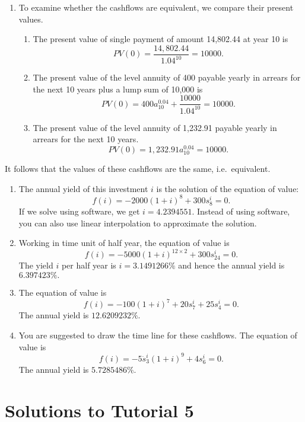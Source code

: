 \documentclass[
]{article}
\theoremstyle{definition}
\theoremstyle{definition}
\theoremstyle{definition}
\theoremstyle{definition}
\theoremstyle{remark}
\begin{document}
\begin{enumerate}
\def\labelenumi{\arabic{enumi}.}
\item
  To examine whether the cashflows are equivalent, we compare their present values.

  \begin{enumerate}
  \def\labelenumii{\alph{enumii}.}
  \item
    The present value of single payment of amount 14,802.44 at year 10 is
    \[ PV(0) =  \frac{14,802.44}{1.04^{10}} = 10000.\]
  \item
    The present value of the level annuity of 400 payable yearly in arrears for the next 10 years plus a lump sum of 10,000 is
    \[ PV(0) =  400 a^{0.04}_{10} +\frac{10000}{1.04^{10}} = 10000.\]
  \item
    The present value of the level annuity of 1,232.91 payable yearly in arrears for the next 10 years.
    \[ PV(0) =  1,232.91 a^{0.04}_{10}  = 10000.\]
  \end{enumerate}
\end{enumerate}

It follows that the values of these cashflows are the same, i.e.~equivalent.

\begin{enumerate}
\def\labelenumi{\arabic{enumi}.}
\setcounter{enumi}{1}
\item
  The annual yield of this investment \(i\) is the solution of the equation of value:
  \[ f(i) = -2000(1+i)^8 +300 s^i_8 = 0. \]
  If we solve using software, we get \(i = 4.2394551%
  \). Instead of using software, you can also use linear interpolation to approximate the solution.
\item
  Working in time unit of half year, the equation of value is
  \[ f(i) = -5000(1+i)^{12 \times 2} + 300 s^i_{24} = 0. \]
  The yield \(i\) per half year is \(i = 3.1491266\%\) and hence the annual yield is \(6.397423\%.\)
\item
  The equation of value is
  \[ f(i) = -100(1+i)^{7} + 20 s^i_{7}  + 25 s^i_{4} = 0. \]
  The annual yield is \(12.6209232\%.\)
\item
  You are suggested to draw the time line for these cashflows. The equation of value is
  \[ f(i) = -5 \ddot{s}^i_{3}(1+i)^{9}   + 4 s^i_{6} = 0. \]
  The annual yield is \(5.7285486\%.\)
\end{enumerate}

\hypertarget{solutions-to-tutorial-5}{%
\section{Solutions to Tutorial 5}\label{solutions-to-tutorial-5}}
\end{document}

